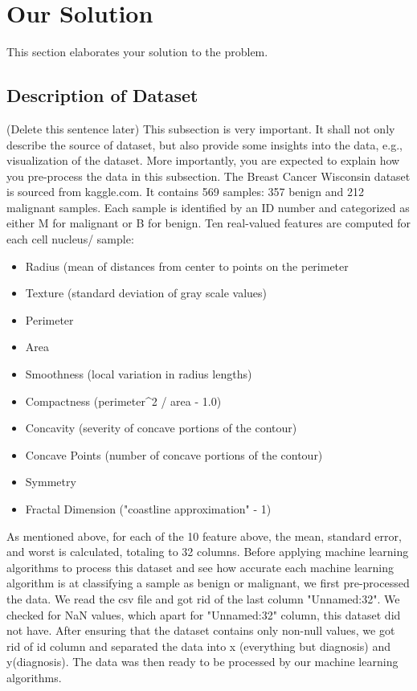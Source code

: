 \documentclass[conference]{IEEEtran}
\begin{document}
\section{Our Solution}
This section elaborates your solution to the problem.

\subsection{Description of Dataset}
(Delete this sentence later)  This subsection is very important. It shall not only describe the source of dataset, but also provide some insights into the data, e.g., visualization of the dataset. More importantly, you are expected to explain how you pre-process the data in this subsection.
The Breast Cancer Wisconsin dataset is sourced from kaggle.com. It contains 569 samples: 357 benign and 212 malignant samples. Each sample is identified by an ID number and categorized as either M for malignant or B for benign. Ten real-valued features are computed for each cell nucleus/ sample: 
\begin{itemize}
	\item Radius (mean of distances from center to points on the perimeter
 	\item Texture (standard deviation of gray scale values)
  	\item Perimeter
   	\item Area
    	\item Smoothness (local variation in radius lengths)
     	\item Compactness (perimeter^2 / area - 1.0)
      	\item Concavity (severity of concave portions of the contour)
       	\item Concave Points (number of concave portions of the contour)
	\item Symmetry
 	\item Fractal Dimension ("coastline approximation" - 1)
\end{itemize}
As mentioned above, for each of the 10 feature above, the mean, standard error, and worst is calculated, totaling to 32 columns. Before applying machine learning algorithms to process this dataset and see how accurate each machine learning algorithm is at classifying a sample as benign or malignant, we first pre-processed the data. We read the csv file and got rid of the last column "Unnamed:32". We checked for NaN values, which apart for "Unnamed:32" column, this dataset did not have. After ensuring that the dataset contains only non-null values, we got rid of id column and separated the data into x (everything but diagnosis) and y(diagnosis). The data was then ready to be processed by our machine learning algorithms.
\end{document}
